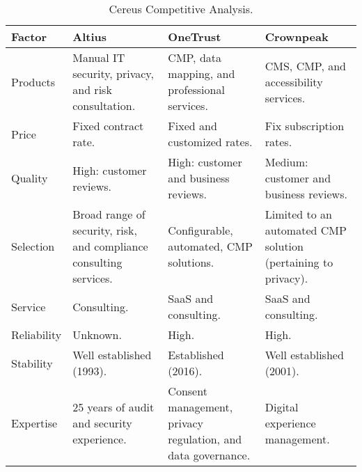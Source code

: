 \begin{sidewaystable}
  \caption{Cereus Competitive Analysis.}
  \centering
  \setlength\tabcolsep{5pt}
  \def\arraystretch{1.2}%

  \begin{tabularx}{\textwidth}{p{2.5cm} | p{6.5cm} | p{6.5cm} | p{6.5cm}}

    \hline

    Factor & Altius & OneTrust & Crownpeak  \\

    \hline
  
    Products & Manual IT security, privacy, and risk consultation.  & CMP, data mapping, and professional services. & CMS, CMP, and accessibility services. \\

    \hline

    Price & Fixed contract rate. & Fixed and customized rates. & Fix subscription rates. \\

    \hline

    Quality & High: customer reviews. & High: customer and business reviews. & Medium: customer and business reviews. \\

    \hline

    Selection & Broad range of security, risk, and compliance consulting services. & Configurable, automated, CMP solutions. & Limited to an automated CMP solution (pertaining to privacy). \\

    \hline

    Service & Consulting. & SaaS and consulting. & SaaS and consulting. \\

    \hline

    Reliability & Unknown. & High. & High. \\

    \hline

    Stability & Well established (1993). & Established (2016). & Well established (2001). \\

    \hline

    Expertise & 25 years of audit and security experience. & Consent management, privacy regulation, and data governance. & Digital experience management. \\

    \hline


\end{tabularx}
\end{sidewaystable}
